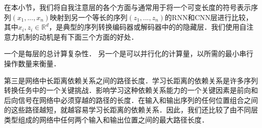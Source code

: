 

在本小节，我们将自我注意层的各个方面与通常用于将一个可变长度的符号表示序列$(x_1, ..., x_n)$映射到另一个等长的序列$(z_1, ..., z_n)$的RNN和CNN层进行比较，其中$x_i, z_i \in \mathbb{R}^d$，是典型的序列转换编码器或解码器中的的隐藏层．我们使用自注意力机制的动机是有下面三个方面的好处．


一个是每层的总计算复杂性．
另一个是可以并行化的计算量，以所需的最小串行操作数量来衡量．



第三是网络中长距离依赖关系之间的路径长度．学习长距离的依赖关系是许多序列转换任务中的一个关键挑战．影响学习这种依赖关系能力的一个关键因素是前向和后向信号在网络中必须穿越的路径的长度．在输入和输出序列的任何位置组合之间的这些路径越短，就越容易学习长距离的依赖关系．因此，我们还比较了由不同层类型组成的网络中任何两个输入和输出位置之间的最大路径长度．


